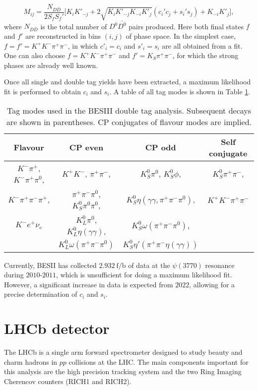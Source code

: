\documentclass[12pt, a4paper, notitlepage, onecolumn]{article}
\numberwithin{equation}{section}
\begin{document}
\begin{equation}
  M_{ij} = \frac{N_{D\bar{D}}}{2S_fS_f'}\Big[K_iK'_{-j} + 2\sqrt{K_iK'_{-j}K_{-i}K'_j}(c_i'c_j + s_i's_j) + K_{-i}K'_j\Big],
\end{equation}
where $N_{D\bar{D}}$ is the total number of $D^0\bar{D^0}$ pairs produced. Here both final states $f$ and $f'$ are reconstructed in bins $(i, j)$ of phase space. In the simplest case, $f = f' = K^+K^-\pi^+\pi^-$, in which $c'_i = c_i$ and $s'_i = s_i$ are all obtained from a fit. One can also choose $f = K^+K^-\pi^+\pi^-$ and $f' = K_S\pi^+\pi^-$, for which the strong phases are already well known.

Once all single and double tag yields have been extracted, a maximum likelihood fit is performed to obtain $c_i$ and $s_i$. A table of all tag modes is shown in Table \ref{table_tag_modes}.

\begin{table}[H]
  \centering
  \caption{Tag modes used in the BESIII double tag analysis. Subsequent decays are shown in parentheses. CP conjugates of flavour modes are implied.}
  \label{table_tag_modes}
  \begin{tabular}{cccc} 
    \toprule
    Flavour & CP even & CP odd & Self conjugate \\
    \midrule
    $K^-\pi^+$, $K^-\pi^+\pi^0$, & $K^+K^-$, $\pi^+\pi^-$,                  & $K_S^0\pi^0$, $K_S^0\phi$,                  & $K_S^0\pi^+\pi^-$, \\
    $K^-\pi^+\pi^-\pi^+$,        & $\pi^+\pi^-\pi^0$, $K_S^0\pi^0\pi^0$,    & $K_S^0\eta(\gamma\gamma, \pi^+\pi^-\pi^0)$, & $K^+K^-\pi^+\pi^-$ \\
    $K^- e^+\nu_e$               & $K_L^0\pi^0$, $K_L^0\eta(\gamma\gamma)$, & $K_S^0\omega(\pi^+\pi^-\pi^0)$,             & \\
                                 & $K_L^0\omega(\pi^+\pi^-\pi^0)$           & $K_S^0\eta'(\pi^+\pi^-\eta(\gamma\gamma))$  & \\
    \bottomrule
  \end{tabular}
\end{table}

Currently, BESII has collected $\SI{2.932}{\femto\per\barn}$ of data at the $\psi(3770)$ resonance during $2010$-$2011$, which is unsufficient for doing a maximum likelihood fit. However, a significant increase in data is expected from $2022$, allowing for a precise determination of $c_i$ and $s_i$.
\section{LHCb detector}
\noindent The LHCb is a single arm forward spectrometer designed to study beauty and charm hadrons in $pp$ collisions at the LHC. The main components important for this analysis are the high precision tracking system and the two Ring Imaging Cherencov counters (RICH1 and RICH2).
\end{document}
